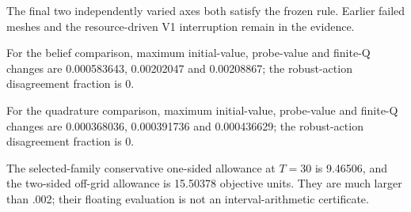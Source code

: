 The final two independently varied axes both satisfy the frozen rule. Earlier failed meshes and the resource-driven V1 interruption remain in the evidence.

For the belief comparison, maximum initial-value, probe-value and finite-Q changes are 0.000583643, 0.00202047 and 0.00208867; the robust-action disagreement fraction is 0.

For the quadrature comparison, maximum initial-value, probe-value and finite-Q changes are 0.000368036, 0.000391736 and 0.000436629; the robust-action disagreement fraction is 0.

The selected-family conservative one-sided allowance at $T=30$ is 9.46506, and the two-sided off-grid allowance is 15.50378 objective units. They are much larger than .002; their floating evaluation is not an interval-arithmetic certificate.
